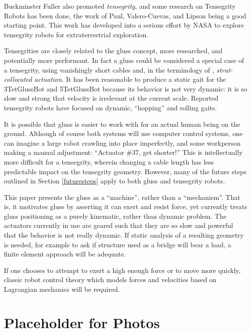 \documentclass[11pt]{article}
\begin{document}
Buckminster Fuller also promoted \emph{tensegrity}, and some research on Tensegrity Robots has been done, the
work of Paul, Valero-Cuevas, and Lipson\cite{paul2006} being a good starting point.
This work has developed into a serious effort\cite{NTRT} by NASA to explore tensegrity robots for extraterrestrial
exploration.

Tensegrities are closely related to the gluss concept, more researched, and potentially more performant.
In fact a gluss could be considered a special case of a tensegrity, using vanishingly short cables
and, in the terminology of \cite{paul2006}, \emph{strut-collocated actuation}.
It has been reasonable to produce a static gait for the 3TetGlussBot and 5TetGlussBot because its behavior is not
very dynamic: it is so slow and strong that velocity is irrelevant at the current scale.
Reported tensegrity robots have focused on dynamic, ``hopping'' and rolling gaits.

It is possible that gluss is easier to work with for an actual human being on the ground.
Although of course both systems will use computer control systems, one can imagine a large robot
crawling into place imperfectly, and some workperson making a manual adjustment: ``Actuator \#37, get shorter!''
This is intellectually more difficult for a tensegrity, wherein changing a cable length
has less predictable impact on the tensegrity geometry.
However, many
of the future steps outlined in Section \ref{futuresteps} apply to both gluss and tensegrity robots.

This paper presents the gluss as a ``machine'', rather than a ``mechanism''. That is, it motivates gluss
by asserting it can exert and resist force, yet currently treats gluss positioning as a purely kinematic,
rather than dynamic problem. The actuators currently in use are geared such that they are so slow
and powerful that the behavior is not really dynamic. If static analysis of a resulting geometry is
needed, for example to ask if structure used as a bridge will bear a load, a finite element approach\cite{geradin2001flexible}
will be adequate.

If one chooses to attempt to exert a high enough force or to move more quickly, classic robot control theory
which models forces and velocities based on Lagrangian mechanics will be required.

\section{Placeholder for Photos}
\end{document}

